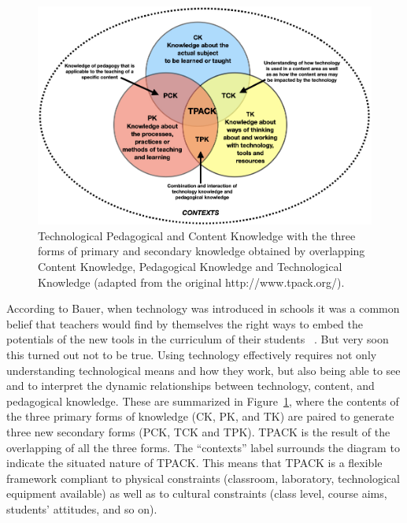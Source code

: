 \documentclass[10pt,journal,compsoc]{IEEEtran}
\begin{document}
\begin{figure}[t]
	\centering
	\includegraphics[width=\columnwidth]{images/TPACK.jpeg}
	\caption{Technological Pedagogical and Content Knowledge with the three forms of primary and secondary knowledge obtained by overlapping Content Knowledge, Pedagogical Knowledge and Technological Knowledge (adapted from the original http://www.tpack.org/).}
	\label{fig:TPACK}       
\end{figure}

According to Bauer, when technology was introduced in schools it was a common belief that teachers would find by themselves the right ways to embed the potentials of the new tools in the curriculum of their students ~\cite{bauer2014music}. But very soon this turned out not to be true. Using technology effectively requires not only understanding technological means and how they work, but also being able to see and to interpret the dynamic relationships between technology, content, and pedagogical knowledge. These are summarized in Figure~\ref{fig:TPACK}, where the contents of the three primary forms of knowledge (CK, PK, and TK) are paired to generate three new secondary forms (PCK, TCK and TPK).
TPACK is the result of the overlapping of all the three forms. 
The ``contexts'' label surrounds the diagram to indicate the situated nature of TPACK. This means that TPACK is a flexible framework compliant to physical constraints (classroom, laboratory, technological equipment available) as well as to cultural constraints (class level, course aims, students' attitudes, and so on). 
\end{document}
